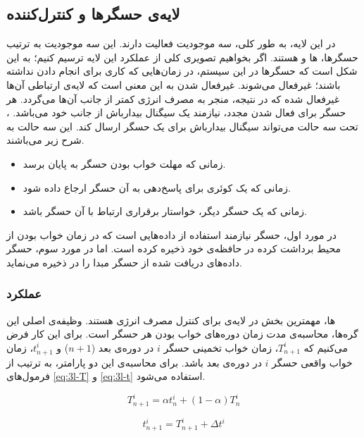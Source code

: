 \subsection{لایه‌ی حسگرها و کنترل‌کننده }
در این لایه، به طور کلی، سه موجودیت فعالیت دارند. این سه موجودیت به ترتیب حسگرها، ها و  هستند. اگر بخواهیم تصویری کلی از عملکرد این لایه ترسیم کنیم؛ به این شکل است که حسگرها در این سیستم، در زمان‌هایی که کاری برای انجام دادن نداشته باشند؛ غیرفعال می‌شوند. غیرفعال شدن به این معنی است که لایه‌ی ارتباطی آن‌ها غیرفعال شده که در نتیجه، منجر به مصرف انرژی کمتر از جانب آن‌ها می‌گردد. هر حسگر برای فعال شدن مجدد، نیازمند یک سیگنال بیدارباش از جانب  خود می‌باشد. ، تحت سه حالت می‌تواند سیگنال بیدارباش برای یک حسگر ارسال کند. این سه حالت به شرح زیر می‌باشند.

\begin{itemize}
\item{زمانی که مهلت خواب بودن حسگر به پایان برسد.}
\item{زمانی که یک کوئری برای پاسخ‌دهی به آن حسگر ارجاع داده شود.}
\item{زمانی که یک حسگر دیگر، خواستار برقراری ارتباط با آن حسگر باشد.}
\end{itemize}

\par
در مورد اول، حسگر نیازمند استفاده از داده‌هایی است که در زمان خواب بودن از محیط برداشت کرده در حافظه‌ی  خود ذخیره کرده است. اما در مورد سوم، حسگر داده‌های دریافت شده از حسگر مبدا را در  ذخیره می‌نماید.

\subsubsection{عملکرد }
ها،
مهمترین بخش در لایه‌ی  برای کنترل مصرف انرژی هستند. وظیفه‌ی اصلی این گره‌ها، محاسبه‌ی مدت زمان دوره‌های خواب بودن هر حسگر است. برای این کار فرض می‌کنیم که $T^i_{n+1}$، زمان خواب تخمینی حسگر $i$ در دوره‌ی بعد ($n + 1$) و $t^i_{n+1}$، زمان خواب واقعی حسگر $i$ در دوره‌ی بعد باشد. برای محاسبه‌ی این دو پارامتر، به ترتیب از فرمول‌های \ref{eq:3l-T} و \ref{eq:3l-t} استفاده می‌شود.

\begin{equation}
T_{n+1}^i = \alpha t_n^i + (1 - \alpha) T^i_n
\label{eq:3l-T}
\end{equation}

\begin{equation}
t_{n+1}^i = T^i_{n+1} + \Delta t^i
\label{eq:3l-t}
\end{equation}

